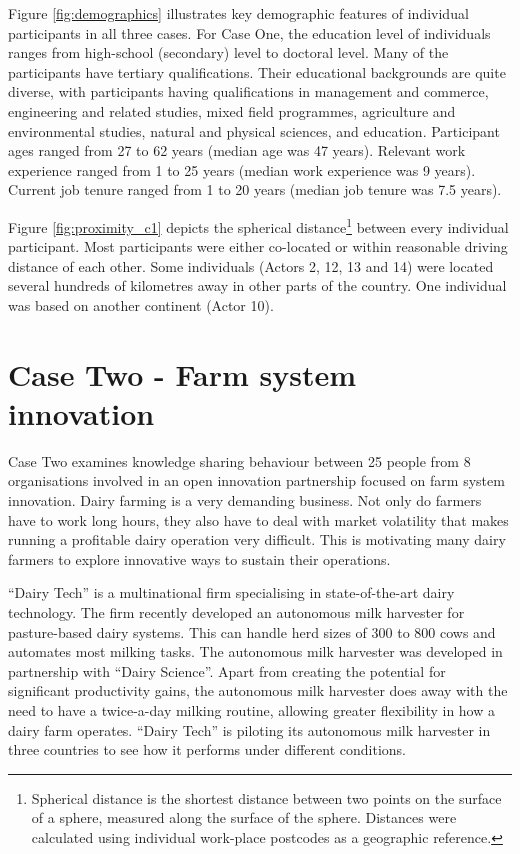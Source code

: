 Figure \ref{fig:demographics} illustrates key demographic features of individual participants in all three cases. For Case One, the education level of individuals ranges from high-school (secondary) level to doctoral level. Many of the participants have tertiary qualifications. Their educational backgrounds are quite diverse, with participants having qualifications in management and commerce, engineering and related studies, mixed field programmes, agriculture and environmental studies, natural and physical sciences, and education. Participant ages ranged from 27 to 62 years (median age was 47 years). Relevant work experience ranged from 1 to 25 years (median work experience was 9 years). Current job tenure ranged from 1 to 20 years (median job tenure was 7.5 years). \medskip

Figure \ref{fig:proximity_c1} depicts the spherical distance\footnote{Spherical distance is the shortest distance between two points on the surface of a sphere, measured along the surface of the sphere. Distances were calculated using individual work-place postcodes as a geographic reference.} between every individual participant. Most participants were either co-located or within reasonable driving distance of each other. Some individuals (Actors 2, 12, 13 and 14) were located several hundreds of kilometres away in other parts of the country. One individual was based on another continent (Actor 10).\medskip

\section{Case Two - Farm system innovation}

Case Two examines knowledge sharing behaviour between 25 people from 8 organisations involved in an open innovation partnership focused on farm system innovation. Dairy farming is a very demanding business. Not only do farmers have to work long hours, they also have to deal with market volatility that makes running a profitable dairy operation very difficult. This is motivating many dairy farmers to explore innovative ways to sustain their operations.\medskip

\enquote{Dairy Tech} is a multinational firm specialising in state-of-the-art dairy technology. The firm recently developed an autonomous milk harvester for pasture-based dairy systems. This can handle herd sizes of 300 to 800 cows and automates most milking tasks. The autonomous milk harvester was developed in partnership with \enquote{Dairy Science}. Apart from creating the potential for significant productivity gains, the autonomous milk harvester does away with the need to have a twice-a-day milking routine, allowing greater flexibility in how a dairy farm operates. \enquote{Dairy Tech} is piloting its autonomous milk harvester in three countries to see how it performs under different conditions. \medskip

